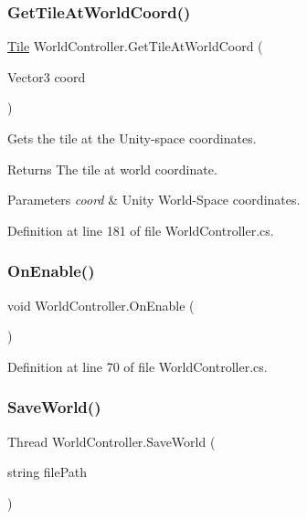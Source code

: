 \subsubsection{\texorpdfstring{Get\+Tile\+At\+World\+Coord()}{GetTileAtWorldCoord()}}
{\footnotesize\ttfamily \hyperlink{class_tile}{Tile} World\+Controller.\+Get\+Tile\+At\+World\+Coord (\begin{DoxyParamCaption}\item[{Vector3}]{coord }\end{DoxyParamCaption})}



Gets the tile at the Unity-\/space coordinates. 

\begin{DoxyReturn}{Returns}
The tile at world coordinate.
\end{DoxyReturn}

\begin{DoxyParams}{Parameters}
{\em coord} & Unity World-\/\+Space coordinates.\\
\hline
\end{DoxyParams}


Definition at line 181 of file World\+Controller.\+cs.

\mbox{\label{class_world_controller_af9220149f50513fb0f7053cb3864da03}} 
\subsubsection{\texorpdfstring{On\+Enable()}{OnEnable()}}
{\footnotesize\ttfamily void World\+Controller.\+On\+Enable (\begin{DoxyParamCaption}{ }\end{DoxyParamCaption})}



Definition at line 70 of file World\+Controller.\+cs.

\mbox{\label{class_world_controller_a87cc9f9a785201e40d14e30ab359a99a}} 
\subsubsection{\texorpdfstring{Save\+World()}{SaveWorld()}}
{\footnotesize\ttfamily Thread World\+Controller.\+Save\+World (\begin{DoxyParamCaption}\item[{string}]{file\+Path }\end{DoxyParamCaption})}



